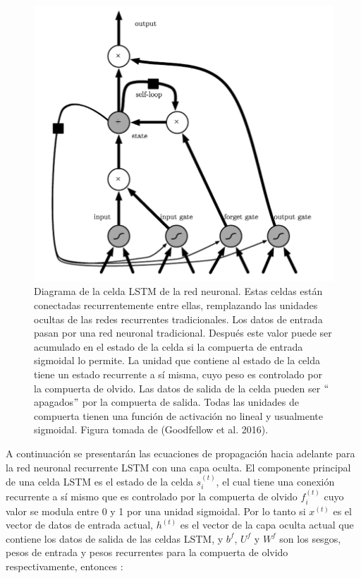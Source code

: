 \begin{figure}[h]
\begin{center}
\includegraphics[width=150mm, scale = 0.8]{./imag/lstm.png}
\end{center}
\caption{Diagrama de la celda LSTM de la red neuronal. Estas celdas están conectadas recurrentemente entre ellas, remplazando las unidades ocultas de las redes recurrentes tradicionales. Los datos de entrada pasan por una red neuronal tradicional. Después este valor puede ser acumulado en el estado de la celda si la compuerta de entrada sigmoidal lo permite. La unidad que contiene al estado de la celda tiene un estado recurrente a sí misma, cuyo peso es controlado por la compuerta de olvido. Las datos de salida de la celda pueden ser $``$apagados$"$ por la compuerta de salida. Todas las unidades de compuerta tienen una función de activación no lineal y usualmente sigmoidal. Figura tomada de (Goodfellow et al. 2016). }
\end{figure}

\vspace{1em}

A continuación se presentarán las ecuaciones de propagación hacia adelante para la red neuronal recurrente LSTM con una capa oculta. El componente principal de una celda LSTM es el estado de la celda $s_i^{(t)}$, el cual tiene una conexión recurrente a sí mismo que es controlado por la compuerta de olvido $f_i^{(t)}$ cuyo valor se modula entre 0 y 1 por una unidad sigmoidal. Por lo tanto si $x^{(t)}$ es el vector de datos de entrada actual, $h^{(t)}$ es el vector de la capa oculta actual que contiene los datos de salida de las celdas LSTM, y $b^f$, $U^f$ y $W^f$ son los sesgos, pesos de entrada y pesos recurrentes para la compuerta de olvido respectivamente, entonces \cite{goodfellow-et-al-2016} \cite{DBLP:journals/corr/Graves13} \cite{DBLP:journals/corr/SakSB14}:

